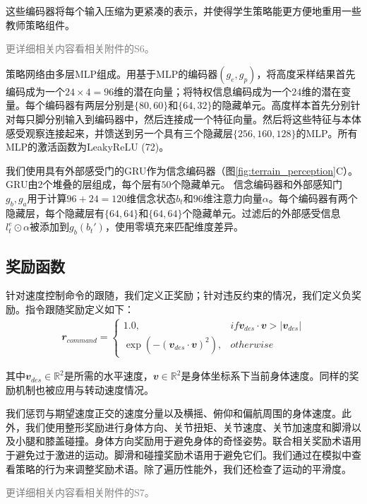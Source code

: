 这些编码器将每个输入压缩为更紧凑的表示，并使得学生策略能更方便地重用一些教师策略组件。

\textcolor{gray}{\small 更详细相关内容看相关附件的S6。}

策略网络由多层MLP组成。用基于MLP的编码器$(g_e,g_p)$，将高度采样结果首先编码成为一个$24\times4=96$维的潜在向量；将特权信息编码成为一个$24$维的潜在变量。每个编码器有两层分别是$\{80,60\}$和$\{64,32\}$的隐藏单元。高度样本首先分别针对每只脚分别输入到编码器中，然后连接成一个特征向量。然后将这些特征与本体感受观察连接起来，并馈送到另一个具有三个隐藏层$\{256, 160, 128\}$的MLP。所有MLP的激活函数为LeakyReLU (72)。

我们使用具有外部感受门的GRU作为信念编码器（图\ref{fig:terrain_perception}C）。GRU由2个堆叠的层组成，每个层有$50$个隐藏单元。
信念编码器和外部感知门$g_b,g_a$用于计算$96 + 24 = 120$维信念状态$b_t$和$96$维注意力向量$\alpha$。每个编码器有两个隐藏层，每个隐藏层有$\{64, 64\}$和$\{64, 64\}$个隐藏单元。过滤后的外部感受信息$l_t^e\odot\alpha$被添加到$g_b(b_t')$，使用零填充来匹配维度差异。

\subsection[奖励函数]{奖励函数}

针对速度控制命令的跟随，我们定义正奖励；针对违反约束的情况，我们定义负奖励。指令跟随奖励定义如下：
\begin{align}
  \mathbfit{r}_{command}=\begin{cases}
    1.0, &if \mathbfit{v}_{des}\cdot\mathbfit{v}>|\mathbfit{v}_{des}|\\
    \exp(-(\mathbfit{v}_{des}\cdot\mathbfit{v})^2), &otherwise
  \end{cases}
\end{align}

其中$\mathbfit{v}_{des}\in\mathbb{R}^2$是所需的水平速度，$\mathbfit{v}\in\mathbb{R}^2$是身体坐标系下当前身体速度。同样的奖励机制也被应用与转动速度情况。

我们惩罚与期望速度正交的速度分量以及横摇、俯仰和偏航周围的身体速度。此外，我们使用整形奖励进行身体方向、关节扭矩、关节速度、关节加速度和脚滑以及小腿和膝盖碰撞。身体方向奖励用于避免身体的奇怪姿势。联合相关奖励术语用于避免过于激进的运动。脚滑和碰撞奖励术语用于避免它们。我们通过在模拟中查看策略的行为来调整奖励术语。除了遍历性能外，我们还检查了运动的平滑度。

\textcolor{gray}{\small 更详细相关内容看相关附件的S7。}

